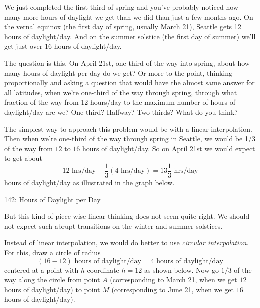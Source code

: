 \documentclass{ximera}
\begin{document}
\iffalse

\begin{example}  \label{Ex:LLL}
We just completed the first third of spring and you've probably noticed how many more hours of daylight we get than we did than just a few months ago. On the vernal equinox (the first day of spring, usually March 21), Seattle gets 12 hours of daylight/day. And on the summer solstice (the first day of summer) we'll get just over 16 hours of daylight/day. 

The question is this. On April 21st, one-third of the way into spring, about how many hours of daylight per day do we get? Or more to the point, thinking proportionally and asking a question that would have the almost same answer for all latitudes, when we're one-third of the way through spring, through what fraction of the way from 12 hours/day to the maximum number of hours of daylight/day are we? One-third? Halfway? Two-thirds? What do you think?

The simplest way to approach this problem would be with a linear interpolation. Then when we're one-third of the way through spring in Seattle, we would be 1/3 of the way from $12$ to $16$ hours of daylight/day. So on April 21st we would expect to get about
\[
    12 \text{ hrs/day} + \frac{1}{3}(4 \text{ hrs/day}) = 13 \frac{1}{3}\text{ hrs/day}
\]
hours of daylight/day as illustrated in the graph below.


\begin{onlineOnly}
    \begin{center}
\end{center}
\end{onlineOnly}

\href{https://www.desmos.com/calculator/esj3yytaug}{142: Hours of Daylight per Day}

But this kind of piece-wise linear thinking does not seem quite right. We should not expect such abrupt transitions on the winter and summer solstices.

Instead of linear interpolation, we would do better to use \emph{circular interpolation}. For this, draw a circle of radius 
\[
     (16 - 12) \text{ hours of daylight/day} = 4 \text{ hours of daylight/day}
\]
centered at a point with $h$-coordinate $h=12$ as shown below. Now go $1/3$ of the way along the circle from point $A$ (corresponding to March 21, when we get $12$ hours of daylight/day) to point $M$ (corresponding to June 21, when we get $16$ hours of daylight/day).


\end{example}
\end{document}
